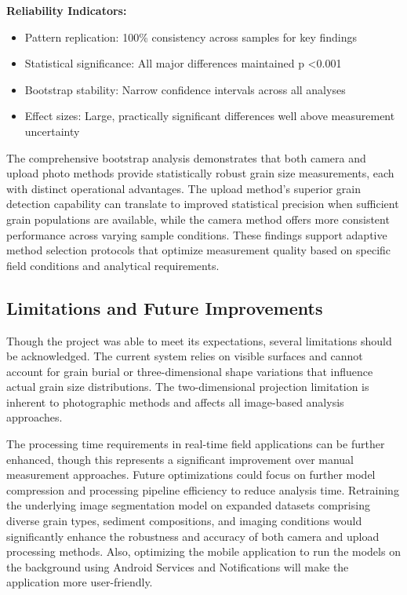 \documentclass[final-report]{report-template}
\begin{document}
\textbf{Reliability Indicators:}

\begin{itemize}
    \item Pattern replication: 100\% consistency across samples for key findings
    \item Statistical significance: All major differences maintained p \textless 0.001
    \item Bootstrap stability: Narrow confidence intervals across all analyses
    \item Effect sizes: Large, practically significant differences well above measurement uncertainty
\end{itemize}

The comprehensive bootstrap analysis demonstrates that both camera and upload photo methods provide statistically robust grain size measurements, each with distinct operational advantages. The upload method's superior grain detection capability can translate to improved statistical precision when sufficient grain populations are available, while the camera method offers more consistent performance across varying sample conditions. These findings support adaptive method selection protocols that optimize measurement quality based on specific field conditions and analytical requirements.

\subsection{Limitations and Future Improvements}
Though the project was able to meet its expectations, several limitations should be acknowledged. The current system relies on visible surfaces and cannot account for grain burial or three-dimensional shape variations that influence actual grain size distributions. The two-dimensional projection limitation is inherent to photographic methods and affects all image-based analysis approaches.

The processing time requirements in real-time field applications can be further enhanced, though this represents a significant improvement over manual measurement approaches. Future optimizations could focus on further model compression and processing pipeline efficiency to reduce analysis time. Retraining the underlying image segmentation model on expanded datasets comprising diverse grain types, sediment compositions, and imaging conditions would significantly enhance the robustness and accuracy of both camera and upload processing methods. Also, optimizing the mobile application to run the models on the background using Android Services and Notifications will make the application more user-friendly.
\end{document}

